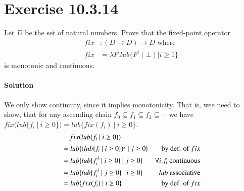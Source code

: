 \documentclass{article}[12pt]
\newcommand{\lub}{\ensuremath{\textit{}{lub}}}
\newcommand{\fix}{\ensuremath{\textit{}{fix}}}
\begin{document}
\section{Exercise 10.3.14}
Let $D$ be the set of natural numbers. Prove that the fixed-point operator
\begin{align*}
    fix &: (D \rightarrow D) \rightarrow D \text{ where }\\
    fix &= \lambda F.\lub\{F^i(\bot)|i\geq 1\}
\end{align*}
is monotonic and continuous.

\paragraph{Solution} We only show continuity, since it implies monotonicity.
That is, wee need to show, that for any ascending chain $f_0 \subseteq f_1 \subseteq f_2 \subseteq \cdots$
we have $\fix(\lub\{f_i\ |\ i \geq 0\}) = \lub\{\fix(f_i)\ |\ i \geq 0\}$.
\begin{align*}
    &\mathbin{\hphantom{=}} \fix(\lub\{f_i\ |\ i \geq 0\})\\
    &=\lub\{(\lub\{f_i\ |\ i \geq 0\})^j\ |\ j \geq 0\}     &\text{ by def. of } \fix\\
    &=\lub\{\lub\{f_i^j\ |\ i \geq 0\}\ |\ j \geq 0\}       &\forall i. f_i \text{ continuous}\\
    &=\lub\{\lub\{f_i^j\ |\ j \geq 0\}\ |\ i \geq 0\}       &\lub \text{ associative}\\
    &=\lub\{\fix(f_i)\ |\ i \geq 0\}                        &\text{ by def. of } \fix
\end{align*}
\end{document}
